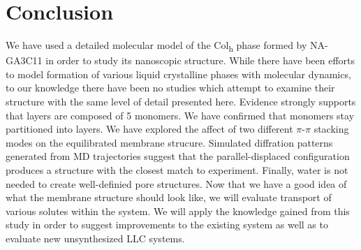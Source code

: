 \documentclass{article}
\begin{document}
  \section{Conclusion}
  
  We have used a detailed molecular model of the Col\textsubscript{h} phase
  formed by NA-GA3C11 in order to study its nanoscopic structure. While there
  have been efforts to model formation of various liquid crystalline phases with
  molecular dynamics, to our knowledge there have been no studies which attempt
  to examine their structure with the same level of detail presented here.
  Evidence strongly supports that layers are composed of 5 monomers. We have
  confirmed that monomers stay partitioned into layers. We have explored the
  affect of two different $\pi$-$\pi$ stacking modes on the equilibrated membrane
  strucure. Simulated diffration patterns generated from MD trajectories suggest
  that the parallel-displaced configuration produces a structure with the closest
  match to experiment. Finally, water is not needed to create well-definied pore
  structures. Now that we have a good idea of what the membrane structure should
  look like, we will evaluate transport of various solutes within the system. We
  will apply the knowledge gained from this study in order to suggest
  improvements to the existing system as well as to evaluate new unsynthesized
  LLC systems.

  \clearpage
  
\end{document}
